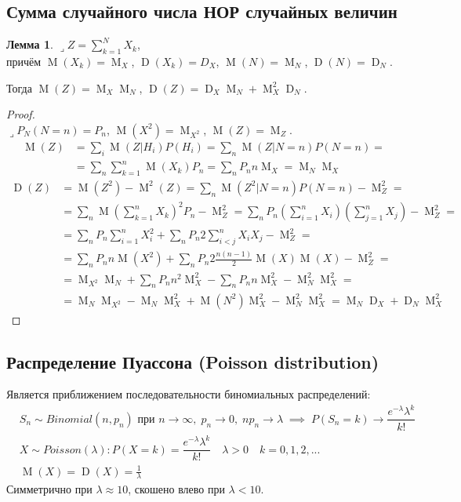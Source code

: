 \documentclass[a4paper,12pt,fleqn]{article}
\newenvironment{onsamepage} {\begin{minipage}{\textwidth}} {\end{minipage}}
\numberwithin{figure}{section}
\theoremstyle{definition}
\newtheorem{lemma}{Лемма}[section]
\DeclareMathOperator{\M}{M}
\DeclareMathOperator{\D}{D}
\def\lets{{\huge$\lrcorner$}\space}
\begin{document}
\subsection{Сумма случайного числа НОР случайных величин}

\begin{onsamepage}
\begin{lemma}
	\lets $Z=\sum_{k=1}^N X_k$, \\
	причём $\M(X_k)=\M_X$, $\D(X_k)=D_X$, $\M(N)=\M_N$, $\D(N)=\D_N$.

	Тогда $\M(Z) = \M_X \M_N$, $\D(Z) = \D_X \M_N + \M_X^2 \D_N$.
\end{lemma}

\begin{proof} ~\\
\lets $P_N(N=n) = P_n$, $\M(X^2) = \M_{X^2}$, $\M(Z) = \M_Z$.
\begin{align*}
	\M(Z) &= \sum_i \M(Z|H_i) P(H_i) = \sum_n \M(Z|N=n) P(N=n) = \\
	      &= \sum_n \sum_{k=1}^n \M(X_k) P_n = \sum_n P_n n \M_X = \M_N \M_X
\end{align*}
\begin{align*}
	\D(Z) &= \M(Z^2) - \M^2(Z) = \sum_n \M(Z^2|N=n) P(N=n) - \M_Z^2 = \\
		  &= \sum_n \M \left( \sum_{k=1}^n X_k \right)^2 P_n - \M_Z^2 =
	         \sum_n P_n \left( \sum_{i=1}^nX_i \right) \left( \sum_{j=1}^nX_j \right) - \M_Z^2 = \\
		  &= \sum_n P_n \sum_{i=1}^n X_i^2 + \sum_n P_n 2 \sum_{i < j}^n X_i X_j - \M_Z^2 = \\
	      &= \sum_n P_n n \M(X^2) + \sum_n P_n 2 \frac{n(n-1)}{2} \M(X) \M(X) - \M_Z^2 = \\
	      &= \M_{X^2} \M_N + \sum_n P_n n^2 \M_X^2 - \sum_n P_n n \M_X^2 - \M_N^2 \M_X^2 = \\
	      &= \M_N \M_{X^2} - \M_N \M_X^2 + \M(N^2) \M_X^2 - \M_N^2 \M_X^2 = \M_N \D_X + \D_N \M_X^2
\end{align*}
\end{proof}
\end{onsamepage}


\subsection{Распределение Пуассона (Poisson distribution)}

Является приближением последовательности биномиальных распределений:
\begin{align*}
&	S_n \sim Binomial(n,p_n) \text{ при } n\to\infty ,\; p_n\to0 ,\; np_n\to\lambda
\;\implies\; P(S_n=k)\to \dfrac{e^{-\lambda}\lambda^k}{k!}		\\
&	X \sim Poisson(\lambda): P(X=k) = \dfrac{e^{-\lambda}\lambda^k}{k!}
\quad \lambda>0 \quad k=0,1,2,...		\\
&	\M(X) = \D(X) = \frac{1}{\lambda}
\end{align*}
Симметрично при $\lambda \approx 10$, скошено влево при $\lambda<10$.
\end{document}
